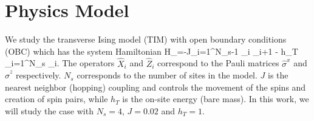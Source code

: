 \section{Physics Model}
\label{sec:model}
We study the transverse Ising model (TIM) with open boundary conditions (OBC) which  has the system Hamiltonian 
\be
H_{}=-J\sum_{i=1}^{N_s-1} _i _{i+1} - h_T \sum_{i=1}^{N_s} _i. \label{eq:H_OBC}
\ee
The operators $\hat{X}_i$ and $\hat{Z}_i$ correspond to the Pauli matrices $\hat{\sigma}^x$ and $\hat{\sigma}^z$ respectively. $N_s$ corresponds to the number of sites in the model. $J$ is the nearest neighbor (hopping) coupling and controls the movement of the spins and creation of spin pairs, while $h_T$ is the on-site energy (bare mass). In this work, we will study the case with $N_s=4$, $J=0.02$ and $h_T=1$.


